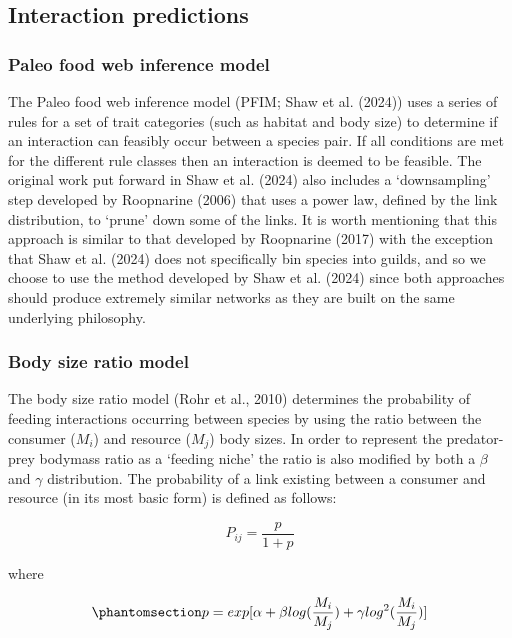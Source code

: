 \documentclass[
]{article}
\begin{document}
\subsection{Interaction predictions}\label{interaction-predictions}

\subsubsection{Paleo food web inference
model}\label{paleo-food-web-inference-model}

The Paleo food web inference model (PFIM; Shaw et al. (2024)) uses a
series of rules for a set of trait categories (such as habitat and body
size) to determine if an interaction can feasibly occur between a
species pair. If all conditions are met for the different rule classes
then an interaction is deemed to be feasible. The original work put
forward in Shaw et al. (2024) also includes a `downsampling' step
developed by Roopnarine (2006) that uses a power law, defined by the
link distribution, to `prune' down some of the links. It is worth
mentioning that this approach is similar to that developed by Roopnarine
(2017) with the exception that Shaw et al. (2024) does not specifically
bin species into guilds, and so we choose to use the method developed by
Shaw et al. (2024) since both approaches should produce extremely
similar networks as they are built on the same underlying philosophy.

\subsubsection{Body size ratio model}\label{body-size-ratio-model}

The body size ratio model (Rohr et al., 2010) determines the probability
of feeding interactions occurring between species by using the ratio
between the consumer (\(M_{i}\)) and resource (\(M_{j}\)) body sizes. In
order to represent the predator-prey bodymass ratio as a `feeding niche'
the ratio is also modified by both a \(\beta\) and \(\gamma\)
distribution. The probability of a link existing between a consumer and
resource (in its most basic form) is defined as follows:

\[
P_{ij} = \frac{p}{1+p}
\]

where

\begin{equation}\phantomsection\label{eq-bodymass}{
p = exp[\alpha + \beta log(\frac{M_{i}}{M_{j}}) + \gamma log^{2}(\frac{M_{i}}{M_{j}})]
}\end{equation}
\end{document}
